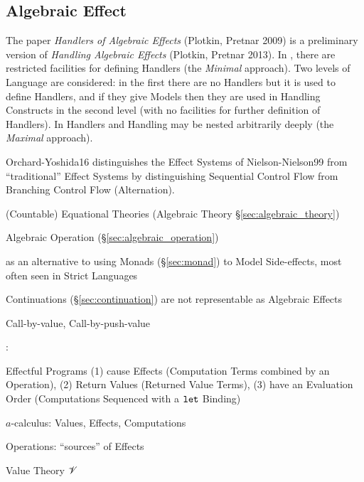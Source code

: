 \subsection{Algebraic Effect}\label{sec:algebraic_effect}

\cite{nielson-nielson99}
\cite{plotkin-pretnar09}
\cite{plotkin-pretnar13}
\cite{pretnar15}

\fist The paper \emph{Handlers of Algebraic Effects}
\cite{plotkin-pretnar09} (Plotkin, Pretnar 2009) is a preliminary
version of \emph{Handling Algebraic Effects} \cite{plotkin-pretnar13}
(Plotkin, Pretnar 2013). In \cite{plotkin-pretnar09}, there are
restricted facilities for defining Handlers (the \emph{Minimal}
approach). Two levels of Language are considered: in the first there
are no Handlers but it is used to define Handlers, and if they give
Models then they are used in Handling Constructs in the second level
(with no facilities for further definition of Handlers). In
\cite{plotkin-pretnar13} Handlers and Handling may be nested
arbitrarily deeply (the \emph{Maximal} approach).


\fist Orchard-Yoshida16 \cite{orchard-yoshida16} distinguishes the
Effect Systems of Nielson-Nielson99 \cite{nielson-nielson99} from
``traditional'' Effect Systems by distinguishing Sequential Control
Flow from Branching Control Flow (Alternation).


(Countable) Equational Theories (Algebraic Theory
\S\ref{sec:algebraic_theory})

Algebraic Operation (\S\ref{sec:algebraic_operation})


as an alternative to using Monads (\S\ref{sec:monad}) to Model
Side-effects, most often seen in Strict Languages

Continuations (\S\ref{sec:continuation}) are not representable as
Algebraic Effects


Call-by-value, Call-by-push-value %


\cite{plotkin-pretnar08}:

Effectful Programs (1) cause Effects (Computation Terms combined by an
Operation), (2) Return Values (Returned Value Terms), (3) have an
Evaluation Order (Computations Sequenced with a $\mathtt{let}$ Binding)

$a$-calculus: Values, Effects, Computations

Operations: ``sources'' of Effects

Value Theory $\mathscr{V}$

